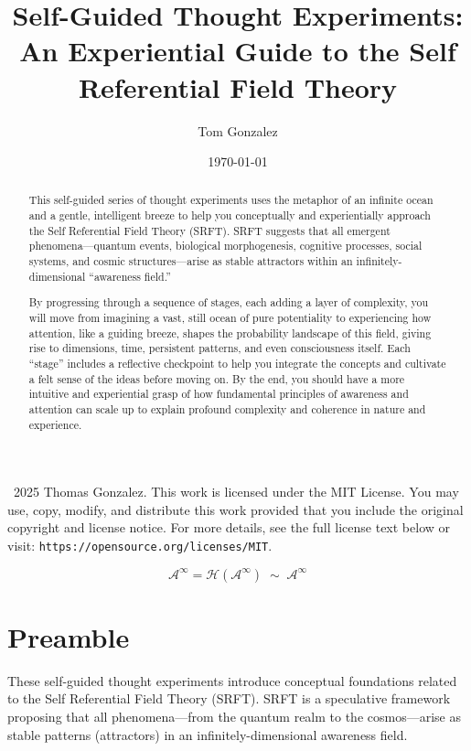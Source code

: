 \documentclass[12pt,a4paper]{article}
\title{\textbf{Self-Guided Thought Experiments: An Experiential Guide to the Self Referential Field Theory}}
\author{Tom Gonzalez}
\date{\today}
\begin{document}
\maketitle

\vfill
\noindent\hrulefill
\medskip

\noindent\textcopyright~2025 Thomas Gonzalez.  
This work is licensed under the MIT License. You may use, copy, modify, and distribute this work provided that you include the original copyright and license notice. For more details, see the full license text below or visit: \texttt{https://opensource.org/licenses/MIT}.

\newpage

\begin{abstract}
This self-guided series of thought experiments uses the metaphor of an infinite ocean and a gentle, intelligent breeze to help you conceptually and experientially approach the Self Referential Field Theory (SRFT). SRFT suggests that all emergent phenomena---quantum events, biological morphogenesis, cognitive processes, social systems, and cosmic structures---arise as stable attractors within an infinitely-dimensional ``awareness field.''

By progressing through a sequence of stages, each adding a layer of complexity, you will move from imagining a vast, still ocean of pure potentiality to experiencing how attention, like a guiding breeze, shapes the probability landscape of this field, giving rise to dimensions, time, persistent patterns, and even consciousness itself. Each ``stage'' includes a reflective checkpoint to help you integrate the concepts and cultivate a felt sense of the ideas before moving on. By the end, you should have a more intuitive and experiential grasp of how fundamental principles of awareness and attention can scale up to explain profound complexity and coherence in nature and experience.
\end{abstract}

\begin{center}
\Large{
\[
\mathscr{A}^\infty = \mathcal{H}(\mathscr{A}^\infty) \;\sim\; \mathscr{A}^\infty
\]
}
\end{center}

\section*{Preamble}
These self-guided thought experiments introduce conceptual foundations related to the Self Referential Field Theory (SRFT). SRFT is a speculative framework proposing that all phenomena---from the quantum realm to the cosmos---arise as stable patterns (attractors) in an infinitely-dimensional awareness field.
\end{document}
